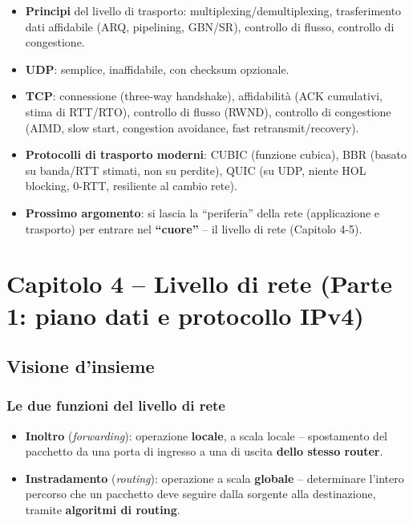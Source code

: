 \documentclass[12pt, a4paper]{article}
\begin{document}
\begin{itemize}
    \item \textbf{Principi} del livello di trasporto: multiplexing/demultiplexing, trasferimento dati affidabile (ARQ, pipelining, GBN/SR), controllo di flusso, controllo di congestione.
    \item \textbf{UDP}: semplice, inaffidabile, con checksum opzionale.
    \item \textbf{TCP}: connessione (three-way handshake), affidabilità (ACK cumulativi, stima di RTT/RTO), controllo di flusso (RWND), controllo di congestione (AIMD, slow start, congestion avoidance, fast retransmit/recovery).
    \item \textbf{Protocolli di trasporto moderni}: CUBIC (funzione cubica), BBR (basato su banda/RTT stimati, non su perdite), QUIC (su UDP, niente HOL blocking, 0-RTT, resiliente al cambio rete).
    \item \textcolor{blue!70!black}{\textbf{Prossimo argomento}}: si lascia la ``periferia'' della rete (applicazione e trasporto) per entrare nel \textbf{``cuore''} -- il livello di rete (Capitolo 4-5).
\end{itemize}


\section{Capitolo 4 -- Livello di rete (Parte 1: piano dati e protocollo IPv4)}

\subsection{Visione d'insieme}

\subsubsection{Le due funzioni del livello di rete}

\begin{itemize}
    \item \textbf{Inoltro} (\textit{forwarding}): operazione \textbf{locale}, a scala locale -- spostamento del pacchetto da una porta di ingresso a una di uscita \textbf{dello stesso router}.
    \item \textbf{Instradamento} (\textit{routing}): operazione a scala \textbf{globale} -- determinare l'intero percorso che un pacchetto deve seguire dalla sorgente alla destinazione, tramite \textbf{algoritmi di routing}.
\end{itemize}
\end{document}
